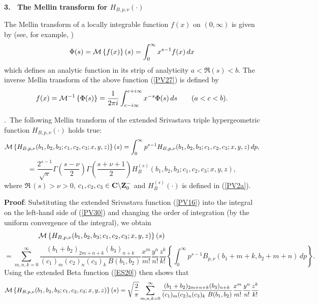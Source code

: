 \begin{center}
{\bf 3. \  The Mellin transform for $H_{B,p,\nu}(\cdot)$}
\end{center}
\setcounter{section}{3}
\setcounter{equation}{0}
\renewcommand{\theequation}{\arabic{section}.\arabic{equation}}
The Mellin transform of a locally integrable function $f(x)$ on $(0,\infty)$ is given by (see, for example,  \cite[p.193, Section 2.1]{AB125})
\begin{equation}\label{PV27}
\Phi(s)={\cal M}\left\{f(x)\right\}(s)=\int_{0}^{\infty}x^{s-1}f(x)\,dx
\end{equation}
which defines an analytic function in its strip of analyticity $a<\Re (s)<b$.
The inverse Mellin transform of the above function (\ref{PV27}) is defined by
\begin{equation}\label{PV28}
f(x)={\cal M}^{-1}\left\{\Phi(s)\right\}=\frac{1}{2\pi i}\int_{c-i\infty}^{c+i\infty}x^{-s}\Phi(s)\,ds \qquad (a<c<b).
\end{equation}
\begin{theorem}$\!\!\!.$\ The following Mellin transform of the extended Srivastava triple hypergeometric function $ H_{B,p,\nu}(\cdot)$  holds true:
\[
{\cal M}\left\{H_{B,p,\nu}(b_{1},b_{2},b_{3};c_{1},c_{2},c_{3};x,y,z)\right\}(s)=\int_{0}^{\infty}p^{s-1}
H_{B,p,\nu}(b_{1},b_{2},b_{3};c_{1},c_{2},c_{3};x,y,z)\,dp,\]
\begin{equation}\label{PV30}
=\frac{2^{s-1}}{\sqrt{\pi}}\Gamma\left(\frac{s-\nu}{2}\right)\Gamma\left(\frac{s+\nu+1}{2}\right)
H_{B}^{(s)}\left(b_{1},b_{2},b_{3};c_{1},c_{2},c_{3};x,y,z\right),
\end{equation}
where $\Re\,(s)>\nu>0$, $c_{1},c_{2},c_{3}\in{\bf C}\backslash{\bf Z}_{0}^{-}$
and $H_B^{(s)}(\cdot)$ is defined in (\ref{PV2a}).
\end{theorem}
\noindent
\textbf{Proof}: Substituting the extended Srivastava function (\ref{PV16}) into the integral on the left-hand side of (\ref{PV30}) and changing the order of integration (by the uniform convergence of the integral), we obtain
\[{\cal M}\left\{H_{B,p,\nu}(b_{1},b_{2},b_{3};c_{1},c_2,c_3;x,y,z)\right\}(s)\hspace{3cm}\] \[=\sum_{m,n,k=0}^{\infty}\frac{(b_{1}+b_{2})_{2m+n+k}(b_{3})_{n+k}}{(c_{1})_{m}(c_{2})_{n}(c_{3})_{k}~B(b_{1},b_{2})}\frac{x^{m}}{m!}\frac{y^{n}}{n!}\frac{z^{k}}{k!}
  \left\{\int_{0}^{\infty}p^{s-1}B_{p,\nu}(b_{1}+m+k,b_{2}+m+n)\,dp\right\}.
\]
Using the extended Beta function (\ref{ES20}) then shows that
\[{\cal M}\left\{H_{B,p,\nu}(b_{1},b_{2},b_{3};c_{1},c_{2},c_{3};x,y,z)\right\}(s)
=\sqrt{\frac{2}{\pi}}\sum_{m,n,k=0}^{\infty}\frac{(b_{1}+b_{2})_{2m+n+k}(b_{3})_{n+k}}{(c_{1})_{m}(c_{2})_{n}(c_{3})_{k}~B(b_{1},b_{2})}\frac{x^{m}}{m!}\frac{y^{n}}{n!}\frac{z^{k}}{k!}\]
